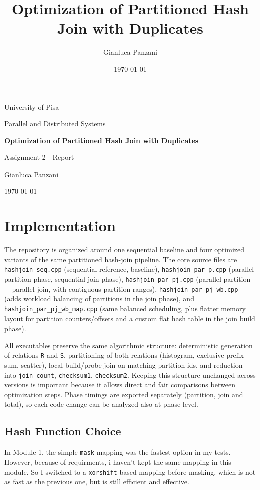 \documentclass[11pt,a4paper]{article}
\title{Optimization of Partitioned Hash Join with Duplicates}
\author{Gianluca Panzani}
\date{\today}
\begin{document}
\begin{titlepage}
    \centering
    {\Large University of Pisa\par}
    \vspace{0.6cm}
    {\large Parallel and Distributed Systems\par}
    \vspace{2.0cm}
    {\LARGE \textbf{Optimization of Partitioned Hash Join with Duplicates}\par}
    \vspace{1.2cm}
    {\large Assignment 2 - Report\par}
    \vfill
    {\large Gianluca Panzani\par}
    \vspace{0.3cm}
    {\large \today\par}
\end{titlepage}

\tableofcontents
\newpage
{}


\section{Implementation}
The repository is organized around one sequential baseline and four optimized variants of the same partitioned hash-join pipeline. The core source files are \texttt{hashjoin\_seq.cpp} (sequential reference, baseline), \texttt{hashjoin\_par\_p.cpp} (parallel partition phase, sequential join phase), \texttt{hashjoin\_par\_pj.cpp} (parallel partition + parallel join, with contiguous partition ranges), \texttt{hashjoin\_par\_pj\_wb.cpp} (adds workload balancing of partitions in the join phase), and \texttt{hashjoin\_par\_pj\_wb\_map.cpp} (same balanced scheduling, plus flatter memory layout for partition counters/offsets and a custom flat hash table in the join build phase).

All executables preserve the same algorithmic structure: deterministic generation of relations \texttt{R} and \texttt{S}, partitioning of both relations (histogram, exclusive prefix sum, scatter), local build/probe join on matching partition ids, and reduction into \texttt{join\_count}, \texttt{checksum1}, \texttt{checksum2}.
Keeping this structure unchanged across versions is important because it allows direct and fair comparisons between optimization steps.  
Phase timings are exported separately (partition, join and total), so each code change can be analyzed also at phase level.

\subsection{Hash Function Choice}
In Module 1, the simple \texttt{mask} mapping was the fastest option in my tests.  
However, because of requirments, i haven't kept the same mapping in this module. So I switched to a \texttt{xorshift}-based mapping before masking, which is not as fast as the previous one, but is still efficient and effective.
\end{document}
